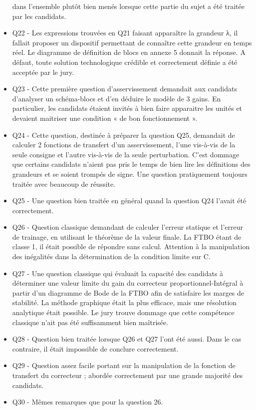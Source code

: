 \documentclass[10pt,fleqn]{article} %
\begin{document}
\begin{itemize}
dans l’ensemble plutôt bien menés lorsque cette partie du sujet a été traitée par les candidats.
\item Q22 - Les expressions trouvées en Q21 faisant apparaître la grandeur λ, il fallait proposer un dispositif
permettant de connaître cette grandeur en temps réel. Le diagramme de définition de blocs en annexe
5 donnait la réponse. A défaut, toute solution technologique crédible et correctement définie a été
acceptée par le jury.
\item Q23 - Cette première question d’asservissement demandait aux candidats d’analyser un schéma-blocs
et d’en déduire le modèle de 3 gains. En particulier, les candidats étaient invités à bien faire apparaitre
les unités et devaient maitriser une condition « de bon fonctionnement ».
\item Q24 - Cette question, destinée à préparer la question Q25, demandait de calculer 2 fonctions de
transfert d’un asservissement, l’une vis-à-vis de la seule consigne et l’autre vis-à-vis de la seule
perturbation. C’est dommage que certains candidats n’aient pas pris le temps de bien lire les définitions
des grandeurs et se soient trompés de signe. Une question pratiquement toujours traitée avec beaucoup
de réussite.
\item Q25 - Une question bien traitée en général quand la question Q24 l’avait été correctement.
\item Q26 - Question classique demandant de calculer l’erreur statique et l’erreur de trainage, en utilisant
le théorème de la valeur finale. La FTBO étant de classe 1, il était possible de répondre sans calcul.
Attention à la manipulation des inégalités dans la détermination de la condition limite sur C.
\item Q27 - Une question classique qui évaluait la capacité des candidats à déterminer une valeur limite du
gain du correcteur proportionnel-Intégral à partir d’un diagramme de Bode de la FTBO afin de satisfaire
les marges de stabilité. La méthode graphique était la plus efficace, mais une résolution analytique
était possible. Le jury trouve dommage que cette compétence classique n’ait pas été suffisamment bien
maîtrisée.
\item Q28 - Question bien traitée lorsque Q26 et Q27 l’ont été aussi. Dans le cas contraire, il était impossible
de conclure correctement.
\item Q29 - Question assez facile portant sur la manipulation de la fonction de transfert du correcteur ;
abordée correctement par une grande majorité des candidats.
\item Q30 - Mêmes remarques que pour la question 26.

\end{itemize}
\end{document}
